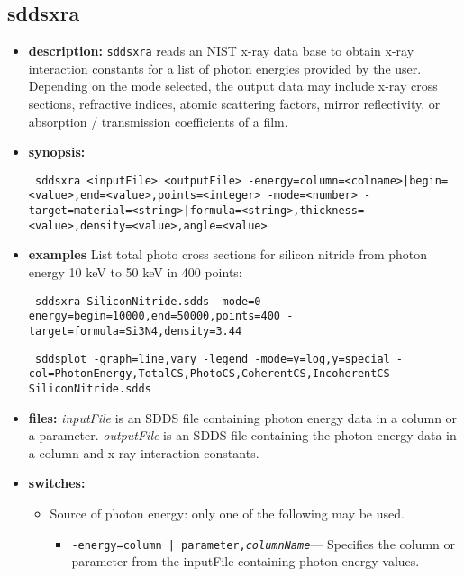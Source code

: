
\newpage
\subsection{sddsxra}
\label{sddsxra}

\begin{itemize}
\item {\bf description:}
\verb|sddsxra| reads an NIST x-ray data base to obtain x-ray interaction constants for a list of photon energies provided by the user. Depending on the mode selected, the output data may include x-ray cross sections, refractive indices, atomic scattering factors, mirror reflectivity, or absorption / transmission coefficients of a film. 
\item {\bf synopsis:} 
\begin{flushleft}{\tt
sddsxra <inputFile> <outputFile> -energy=column=<colname>|begin=<value>,end=<value>,points=<integer> 
-mode=<number> -target=material=<string>|formula=<string>,thickness=<value>,density=<value>,angle=<value>
}\end{flushleft}
\item {\bf examples} List total photo cross sections for silicon nitride from photon energy 10 keV to 50 keV in 400 points: 
\begin{flushleft}{\tt
 sddsxra SiliconNitride.sdds -mode=0 -energy=begin=10000,end=50000,points=400 -target=formula=Si3N4,density=3.44 
}\end{flushleft}
\begin{flushleft}{\tt
 sddsplot -graph=line,vary -legend -mode=y=log,y=special -col=PhotonEnergy,{TotalCS,PhotoCS,CoherentCS,IncoherentCS} SiliconNitride.sdds 
}\end{flushleft}
\item {\bf files:}
        {\em inputFile} is an SDDS file containing photon energy data in a column or a parameter. 
        {\em outputFile} is an SDDS file containing the photon energy data in a column and x-ray interaction constants. 
\item {\bf switches:}
    \begin{itemize}
    \item Source of photon energy: only one of the following may be used. 
         \begin{itemize}
          \item {\tt -energy={column | parameter},{\em columnName}}---
                  Specifies the column or parameter from the inputFile containing photon energy values. 

\end{itemize}
\end{itemize}
\end{itemize}
